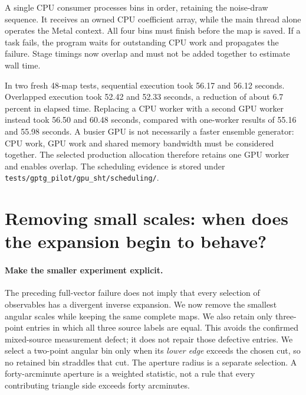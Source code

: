 \documentclass[11pt]{article}
\begin{document}
A single CPU consumer processes bins in order, retaining the noise-draw
sequence. It receives an owned CPU coefficient array, while the main
thread alone operates the Metal context. All four bins must finish before
the map is saved. If a task fails, the program waits for outstanding CPU
work and propagates the failure. Stage timings now overlap and must not
be added together to estimate wall time.

In two fresh 48-map tests, sequential execution took 56.17 and 56.12
seconds. Overlapped execution took 52.42 and 52.33 seconds, a reduction
of about 6.7 percent in elapsed time. Replacing a CPU worker with a second
GPU worker instead took 56.50 and 60.48 seconds, compared with one-worker
results of 55.16 and 55.98 seconds. A busier GPU is not necessarily a
faster ensemble generator: CPU work, GPU work and shared memory bandwidth
must be considered together. The selected production allocation therefore
retains one GPU worker and enables overlap. The scheduling evidence is
stored under \texttt{tests/gptg\_pilot/gpu\_sht/scheduling/}.

\section{Removing small scales: when does the expansion begin to behave?}
\paragraph{Make the smaller experiment explicit.}
The preceding full-vector failure does not imply that every selection of
observables has a divergent inverse expansion. We now remove the smallest
angular scales while keeping the same complete maps. We also retain only
three-point entries in which all three source labels are equal. This
avoids the confirmed mixed-source measurement defect; it does not repair
those defective entries. We select a two-point angular bin only when its
\emph{lower edge} exceeds the chosen cut, so no retained bin straddles that
cut. The aperture radius is a separate selection. A forty-arcminute
aperture is a weighted statistic, not a rule that every contributing
triangle side exceeds forty arcminutes.
\end{document}
